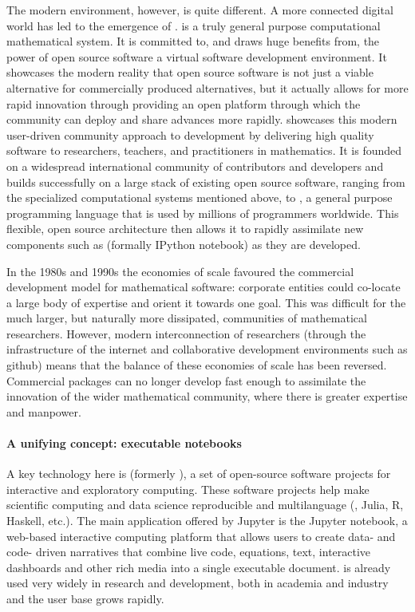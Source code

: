 The modern environment, however, is quite different. A more connected
digital world has led to the emergence of \Sage. \Sage is a truly
general purpose computational mathematical system. It is committed to,
and draws huge benefits from, the power of open source software a
virtual software development environment. It showcases the modern
reality that open source software is not just a viable alternative for
commercially produced alternatives, but it actually allows for more
rapid innovation through providing an open platform through which the
community can deploy and share advances more rapidly. \Sage showcases
this modern user-driven community approach to development by
delivering high quality software to researchers, teachers, and
practitioners in mathematics. It is founded on a widespread
international community of contributors and developers and builds
successfully on a large stack of existing open source software,
ranging from the specialized computational systems mentioned above, to
\Python, a general purpose programming language that is used by
millions of programmers worldwide. This flexible, open source
architecture then allows it to rapidly assimilate new components such
as \Jupyter (formally IPython notebook) as they are developed.

In the 1980s and 1990s the economies of scale favoured the commercial
development model for mathematical software: corporate entities could
co-locate a large body of expertise and orient it towards one
goal. This was difficult for the much larger, but naturally more
dissipated, communities of mathematical researchers. However, modern
interconnection of researchers (through the infrastructure of the
internet and collaborative development environments such as github)
means that the balance of these economies of scale has been
reversed. Commercial packages can no longer develop fast enough to
assimilate the innovation of the wider mathematical community, where
there is greater expertise and manpower.


\paragraph{A unifying concept: executable notebooks}

A key technology here is \Jupyter (formerly
\IPython), a set of open-source software projects for interactive and
exploratory computing. These software projects help make scientific
computing and data science reproducible and multilanguage (\Python,
Julia, R, Haskell, etc.). The main application offered by Jupyter is
the Jupyter notebook, a web-based interactive computing platform that
allows users to create data- and code- driven narratives that combine
live code, equations, text, interactive dashboards and other rich
media into a single executable document. \Jupyter is already used very
widely in research and development, both in academia and industry and
the user base grows rapidly.

